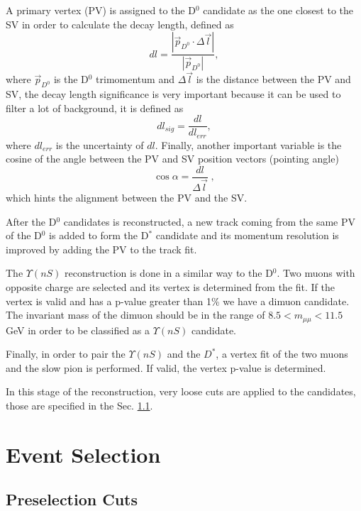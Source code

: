 A primary vertex (PV) is assigned to the D$^0$ candidate as the one closest to the SV in order to calculate the decay length, defined as
\begin{equation}
    dl = \frac{|\Vec{p}_{D^0} \cdot \Delta\Vec{l}|}{|\Vec{p}_{D^0}|},
\end{equation}
where $\Vec{p}_{D^0}$ is the D$^0$ trimomentum and $\Delta\Vec{l}$ is the distance between the PV and SV, the decay length significance is very important because it can be used to filter a lot of background, it is defined as
\begin{equation}
    dl_{sig} = \frac{dl}{dl_{err}},
\end{equation}
where $dl_{err}$ is the uncertainty of $dl$. Finally, another important variable is the cosine of the angle between the PV and SV position vectors (pointing angle)
\begin{equation}
    \cos{\alpha} = \frac{dl}{\Delta\Vec{l}} \; ,
\end{equation}
which hints the alignment between the PV and the SV.

After the D$^0$ candidates is reconstructed, a new track coming from the same PV of the D$^0$ is added to form the D$^*$ candidate and its momentum resolution is improved by adding the PV to the track fit.

The $\Upsilon(nS)$ reconstruction is done in a similar way to the D$^0$. Two muons with opposite charge are selected and its vertex is determined from the fit. If the vertex is valid and has a p-value greater than 1\% we have a dimuon candidate. The invariant mass of the dimuon should be in the range of $8.5 < m_{\mu\mu} < 11.5$ GeV in order to be classified as a $\Upsilon(nS)$ candidate. 

Finally, in order to pair the $\Upsilon(nS)$ and the $D^*$, a vertex fit of the two muons and the slow pion is performed. If valid, the vertex p-value is determined.

In this stage of the reconstruction, very loose cuts are applied to the candidates, those are specified in the Sec. \ref{subsec:preselcuts}.

\section{Event Selection}\label{sec:evtsel}

\subsection{Preselection Cuts} \label{subsec:preselcuts}

